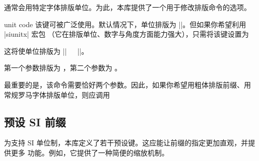 通常会用特定字体排版单位。为此，本库提供了一个用于修改排版命令的选项。

\begin{pgfplotscodetwokey}{unit code}%
    该键可被广泛使用。默认情况下，单位排版为
    ||。但如果你希望利用 |siunitx| 宏包
    （它在排版单位、数字与角度方面能力强大），只需将该键设置为
\begin{codeexample}
\end{codeexample}
    这将使单位排版为 |\si{||}|。

    第一个参数排版为 ，第二个参数为 。

    最重要的是，该命令需要恰好两个参数。因此，如果你希望用粗体排版前缀、用
    常规罗马字体排版单位，则应调用
\begin{codeexample}[code only]
\pgfplotsset{unit code/.code 2 args={\mathbf{#1}\mathrm{#2}}
\end{codeexample}
\end{pgfplotscodetwokey}


\subsection{预设 SI 前缀}
\label{sec:SI:prefix}

为支持 SI 单位制，本库定义了若干预设键。这应能让前缀的指定更加直观，并提供更多
功能。例如，它提供了一种简便的缩放机制。

